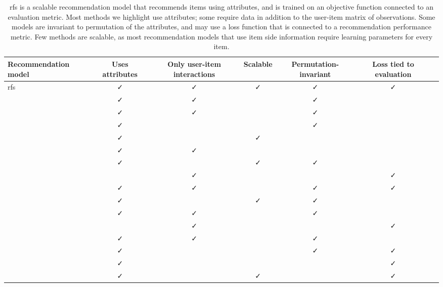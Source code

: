 \newcommand{\x}{\faCheck}
\begin{table*}%
  \begin{center}
    \begin{tabular}{lcccccc}
      \toprule
      Recommendation model & Uses attributes & Only user-item interactions & Scalable & Permutation-invariant & Loss tied to evaluation \\
      \midrule
      \acrlong{rfs} & \x & \x & \x & \x & \x \\
      \citet{wang2011collaborative} & \x & \x & & \x & \\
      \citet{gopalan2014content-based}& \x & \x  &  & \x &\\
      \citet{dong2017a-hybrid}& \x & & & \x &\\
      \citet{chen2017joint}&\x & &\x & &\\
      \citet{bansal2016ask-the-gru:}&\x & \x & & &\\
      \citet{xu2017tag-aware}& \x & & \x & \x &\\
      \citet{rendle2009bpr:}&  & \x &  & & \x\\
      \citet{shi2012tfmap:} &\x & \x & & \x & \x\\
      \citet{wu2018starspace:} &\x & &\x &\x &\\
      \citet{kula2015metadata} & \x & \x &  & \x &\\
      \citet{shi2012climf:} & & \x & & &\x \\
      \citet{chen2018a-collective} & \x & \x & & \x & \\
      \citet{liu2014recommending} & \x & & & \x & \x \\
      \citet{cao2017embedding} & \x & &  & & \x \\
      \citet{okura2017embedding-based} & \x & & \x & & \x \\
      \bottomrule
    \end{tabular}
    \caption{\label{tab:background}\acrlong{rfs} is a scalable recommendation
      model that recommends items using attributes, and is trained on an
      objective function connected to an evaluation metric. Most methods we
      highlight use attributes; some require data in addition to the user-item
      matrix of observations. Some models are invariant to permutation of the
      attributes, and may use a loss function that is connected to a
      recommendation performance metric. Few methods are scalable, as most
      recommendation models that use item side information require learning
      parameters for every item. }
    \vspace{-0.5cm}
  \end{center}
\end{table*}


